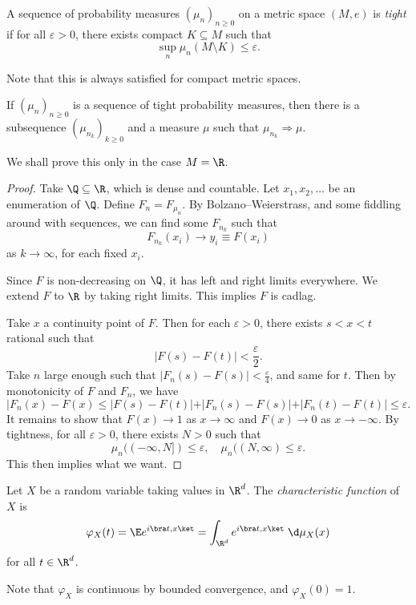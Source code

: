 \documentclass[a4paper]{article}
\begin{document}
\begin{defi}
  A sequence of probability measures $(\mu_n)_{n \geq 0}$ on a metric space $(M, e)$ is \emph{tight} if for all $\varepsilon > 0$, there exists compact $K \subseteq M$ such that
  \[
    \sup_n \mu_n (M \setminus K) \leq \varepsilon.
  \]
\end{defi}
Note that this is always satisfied for compact metric spaces.

\begin{thm}
  If $(\mu_n)_{n \geq 0}$ is a sequence of tight probability measures, then there is a subsequence $(\mu_{n_k})_{k \geq 0}$ and a measure $\mu$ such that $\mu_{n_k} \Rightarrow \mu$.
\end{thm}

We shall prove this only in the case $M = \R$.

\begin{proof}
  Take $\Q\subseteq \R$, which is dense and countable. Let $x_1, x_2, \ldots$ be an enumeration of $\Q$. Define $F_n = F_{\mu_n}$. By Bolzano--Weierstrass, and some fiddling around with sequences, we can find some $F_{n_k}$ such that
  \[
    F_{n_k}(x_i) \to y_i \equiv F(x_i)
  \]
  as $k \to \infty$, for each fixed $x_i$.

  Since $F$ is non-decreasing on $\Q$, it has left and right limits everywhere. We extend $F$ to $\R$ by taking right limits. This implies $F$ is cadlag.

  Take $x$ a continuity point of $F$. Then for each $\varepsilon > 0$, there exists $s < x < t$ rational such that
  \[
    |F(s) - F(t)| < \frac{\varepsilon}{2}.
  \]
  Take $n$ large enough such that $|F_n(s) - F(s)| < \frac{\varepsilon}{4}$, and same for $t$. Then by monotonicity of $F$ and $F_n$, we have
  \[
    |F_n(x) - F(x) \leq |F(s) - F(t)| + |F_n(s) - F(s) | + |F_n(t) - F(t)| \leq \varepsilon.
  \]
  It remains to show that $F(x) \to 1$ as $x \to \infty$ and $F(x) \to 0$ as $x \to -\infty$. By tightness, for all $\varepsilon > 0$, there exists $N > 0$ such that
  \[
    \mu_n((-\infty, N]) \leq \varepsilon,\quad \mu_n((N, \infty) \leq \varepsilon.
  \]
  This then implies what we want.
\end{proof}

\begin{defi}
  Let $X$ be a random variable taking values in $\R^d$. The \emph{characteristic function} of $X$ is
  \[
    \varphi_X(t) = \E e^{i \bra t, x\ket} = \int_{\R^d} e^{i\bra t, x\ket}\;\d \mu_X(x)
  \]
  for all $t \in \R^d$.
\end{defi}
Note that $\varphi_X$ is continuous by bounded convergence, and $\varphi_X(0) = 1$.
\end{document}
